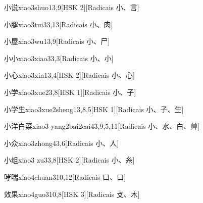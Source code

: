 \begin{entry}{小说}{xiao3shuo1}{3,9}[HSK 2][Radicais ⼩、⾔]
\end{entry}

\begin{entry}{小腿}{xiao3tui3}{3,13}[Radicais ⼩、⾁]
\end{entry}

\begin{entry}{小屋}{xiao3wu1}{3,9}[Radicais ⼩、⼫]
\end{entry}

\begin{entry}{小小}{xiao3xiao3}{3,3}[Radicais ⼩、⼩]
\end{entry}

\begin{entry}{小心}{xiao3xin1}{3,4}[HSK 2][Radicais ⼩、⼼]
\end{entry}

\begin{entry}{小学}{xiao3xue2}{3,8}[HSK 1][Radicais ⼩、⼦]
\end{entry}

\begin{entry}{小学生}{xiao3xue2sheng1}{3,8,5}[HSK 1][Radicais ⼩、⼦、⽣]
\end{entry}

\begin{entry}{小洋白菜}{xiao3 yang2bai2cai4}{3,9,5,11}[Radicais ⼩、⽔、⽩、⾋]
\end{entry}

\begin{entry}{小众}{xiao3zhong4}{3,6}[Radicais ⼩、⼈]
\end{entry}

\begin{entry}{小组}{xiao3 zu3}{3,8}[HSK 2][Radicais ⼩、⽷]
\end{entry}

\begin{entry}{哮喘}{xiao4chuan3}{10,12}[Radicais ⼝、⼝]
\end{entry}

\begin{entry}{效果}{xiao4guo3}{10,8}[HSK 3][Radicais ⽁、⽊]
\end{entry}

